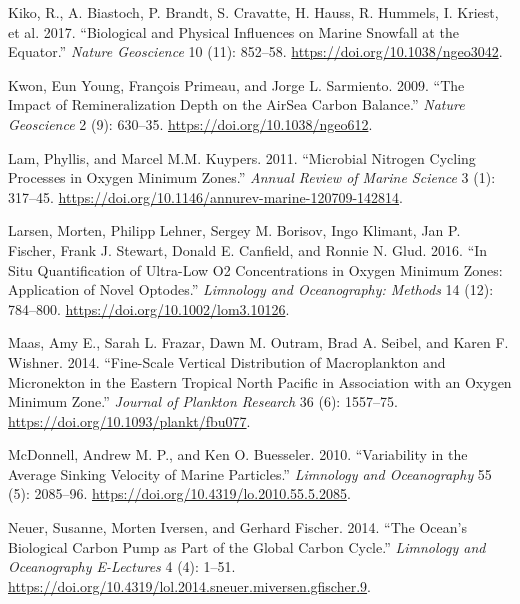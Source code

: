 \documentclass[]{article}
\begin{document}
\leavevmode\hypertarget{ref-kikoBiologicalPhysicalInfluences2017}{}%
Kiko, R., A. Biastoch, P. Brandt, S. Cravatte, H. Hauss, R. Hummels, I.
Kriest, et al. 2017. ``Biological and Physical Influences on Marine
Snowfall at the Equator.'' \emph{Nature Geoscience} 10 (11): 852--58.
\url{https://doi.org/10.1038/ngeo3042}.

\leavevmode\hypertarget{ref-kwonImpactRemineralizationDepth2009}{}%
Kwon, Eun Young, François Primeau, and Jorge L. Sarmiento. 2009. ``The
Impact of Remineralization Depth on the AirSea Carbon Balance.''
\emph{Nature Geoscience} 2 (9): 630--35.
\url{https://doi.org/10.1038/ngeo612}.

\leavevmode\hypertarget{ref-lamMicrobialNitrogenCycling2011}{}%
Lam, Phyllis, and Marcel M.M. Kuypers. 2011. ``Microbial Nitrogen
Cycling Processes in Oxygen Minimum Zones.'' \emph{Annual Review of
Marine Science} 3 (1): 317--45.
\url{https://doi.org/10.1146/annurev-marine-120709-142814}.

\leavevmode\hypertarget{ref-larsenSituQuantificationUltralow2016}{}%
Larsen, Morten, Philipp Lehner, Sergey M. Borisov, Ingo Klimant, Jan P.
Fischer, Frank J. Stewart, Donald E. Canfield, and Ronnie N. Glud. 2016.
``In Situ Quantification of Ultra-Low O2 Concentrations in Oxygen
Minimum Zones: Application of Novel Optodes.'' \emph{Limnology and
Oceanography: Methods} 14 (12): 784--800.
\url{https://doi.org/10.1002/lom3.10126}.

\leavevmode\hypertarget{ref-maasFinescaleVerticalDistribution2014}{}%
Maas, Amy E., Sarah L. Frazar, Dawn M. Outram, Brad A. Seibel, and Karen
F. Wishner. 2014. ``Fine-Scale Vertical Distribution of Macroplankton
and Micronekton in the Eastern Tropical North Pacific in Association
with an Oxygen Minimum Zone.'' \emph{Journal of Plankton Research} 36
(6): 1557--75. \url{https://doi.org/10.1093/plankt/fbu077}.

\leavevmode\hypertarget{ref-mcdonnellVariabilityAverageSinking2010}{}%
McDonnell, Andrew M. P., and Ken O. Buesseler. 2010. ``Variability in
the Average Sinking Velocity of Marine Particles.'' \emph{Limnology and
Oceanography} 55 (5): 2085--96.
\url{https://doi.org/10.4319/lo.2010.55.5.2085}.

\leavevmode\hypertarget{ref-neuerOceanBiologicalCarbon2014}{}%
Neuer, Susanne, Morten Iversen, and Gerhard Fischer. 2014. ``The Ocean's
Biological Carbon Pump as Part of the Global Carbon Cycle.''
\emph{Limnology and Oceanography E-Lectures} 4 (4): 1--51.
\url{https://doi.org/10.4319/lol.2014.sneuer.miversen.gfischer.9}.
\end{document}
